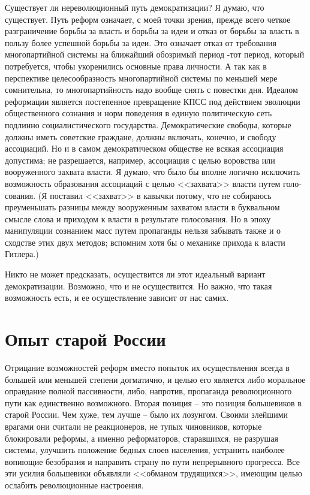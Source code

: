 \documentclass{book}
\begin{document}
Существует ли нереволюционный путь демократизации? Я думаю, что существует. Путь реформ означает, с моей точки зрения, прежде всего четкое разграничение борьбы за власть и борьбы за идеи и отказ от борьбы за власть в пользу более успешной борьбы за идеи. Это означает отказ от требования многопартийной системы на ближайший обозримый период -тот период, который потребуется, чтобы укоренились основные права личности. А так как в перспективе целесообразность многопартийной системы по меньшей мере сомнительна, то мно­гопартийность надо вообще снять с повестки дня. Идеалом ре­формации является постепенное превращение КПСС под дей­ствием эволюции общественного сознания и норм поведения в единую политическую сеть подлинно социалистического госу­дарства. Демократические свободы, которые должны иметь советские граждане, должны включать, конечно, и свободу ассоциаций. Но и в самом демократическом обществе не вся­кая ассоциация допустима; не разрешается, например, ассо­циация с целью воровства или вооруженного захвата 
власти. Я думаю, что было бы вполне логично исключить возможность образования ассоциаций с целью <<захвата>> власти путем голо­сования. (Я поставил <<захват>> в кавычки потому, что не соби­раюсь преуменьшать разницы между вооруженным захватом власти в буквальном смысле слова и приходом к власти в ре­зультате голосования. Но в эпоху манипуляции сознанием масс путем пропаганды нельзя забывать также и о сходстве этих двух методов; вспомним хотя бы о механике прихода к власти Гитлера.)

Никто не может предсказать, осуществится ли этот идеальный вариант демократизации. Возможно, что и не осуществится. Но важно, что такая возможность есть, и ее осуществление зависит от нас самих.

\section{Опыт старой России}


Отрицание возможностей реформ вместо попыток их осу­ществления всегда в большей или меньшей степени догматич­но, и целью его является либо моральное оправдание полной пассивности, либо, напротив, пропаганда революционного пути как единственно возможного. Вторая позиция -- это позиция большевиков в старой России. Чем хуже, тем лучше -- было их лозунгом. Своими злейшими врагами они считали не реакционеров, не тупых чиновников, которые блокировали реформы, а именно реформаторов, старавшихся, не разрушая системы, улучшить положение бедных слоев населения, устранить наиболее вопиющие безобразия и направить страну по пути непрерывного прогресса. Все эти усилия большевики объявляли <<обманом трудящихся>>, имеющим целью ослабить революционные настроения.
\end{document}
